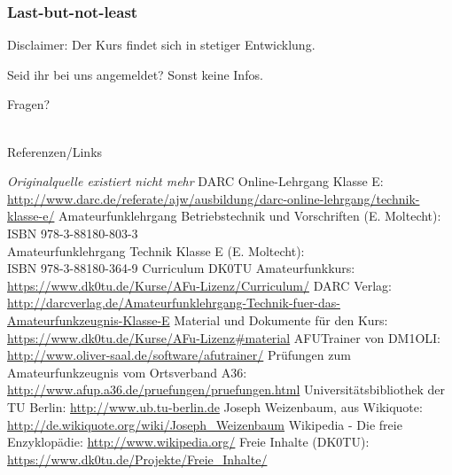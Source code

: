 \begin{frame}
    \frametitle{Last-but-not-least}

    Disclaimer: Der Kurs findet sich in stetiger Entwicklung.

    \bigskip
    \pause

    Seid ihr bei uns angemeldet? Sonst keine Infos.

    \bigskip
    \pause

    Fragen?

\end{frame}

\renewcommand{\refname}{Referenzen}

\hypertarget{refs}{}
\textcolor{white}{} \\ %
\Large Referenzen/Links
\footnotesize

\begin{thebibliography}{}
      \emph{Originalquelle existiert nicht mehr}
      DARC Online-Lehrgang Klasse E:
                    \url{http://www.darc.de/referate/ajw/ausbildung/darc-online-lehrgang/technik-klasse-e/}
     Amateurfunklehrgang Betriebstechnik und Vorschriften (E. Moltecht): \\
                    ISBN 978-3-88180-803-3 \\
                    Amateurfunklehrgang Technik Klasse E (E. Moltecht): \\
                    ISBN 978-3-88180-364-9
      Curriculum DK0TU Amateurfunkkurs: \\
                    \url{https://www.dk0tu.de/Kurse/AFu-Lizenz/Curriculum/}
     DARC Verlag:
                    \url{http://darcverlag.de/Amateurfunklehrgang-Technik-fuer-das-Amateurfunkzeugnis-Klasse-E}
       Material und Dokumente für den Kurs:
                    \url{https://www.dk0tu.de/Kurse/AFu-Lizenz#material}
      AFUTrainer von DM1OLI:
                    \url{http://www.oliver-saal.de/software/afutrainer/}
      Prüfungen zum Amateurfunkzeugnis vom Ortsverband A36:
                    \url{http://www.afup.a36.de/pruefungen/pruefungen.html}
        Universitätsbibliothek der TU Berlin:
                    \url{http://www.ub.tu-berlin.de}
     Joseph Weizenbaum, aus Wikiquote:
                    \url{http://de.wikiquote.org/wiki/Joseph_Weizenbaum}
        Wikipedia - Die freie Enzyklopädie:
                    \url{http://www.wikipedia.org/}
        Freie Inhalte (DK0TU):
                    \url{https://www.dk0tu.de/Projekte/Freie_Inhalte/}
\end{thebibliography} 


